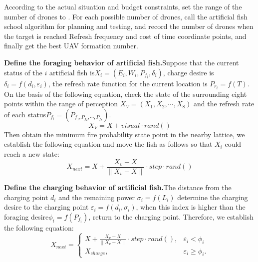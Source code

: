 \documentclass[13pt]{ctexart}
\begin{document}
According to the actual situation and budget constraints, set the range of the number of drones to . For each possible number of drones, call the artificial fish school algorithm for planning and testing, and record the number of drones when the target is reached Refresh frequency and cost of time coordinate points, and finally get the best UAV formation number.

\textbf{Define the foraging behavior of artificial fish.}\quad Suppose that the current status of the $i$ artificial fish is$X_{i}=(E_{i},W_{i},P_{f_{i}},\delta_{i})$, charge desire is $\delta_{i}=f(d_{i},\varepsilon_{i})$, the refresh rate function for the current location is $P_{r_{i}}=f(T)$. On the basis of the following equation, check the state of the surrounding eight points within the range of perception  $X_{V}=(X_{1},X_{2},\cdots,X_{8})$ and the refresh rate of each status$P_{f_{i}}=(P_{f_{1},P_{f_{2}},\cdots,P_{f_{8}}})$.
\begin{equation}
	{X_{V}=X+visual \cdot rand()}
	\tag{2.1}
\end{equation}
Then obtain the minimum fire probability state point in the nearby lattice, we establish the following equation and move the fish as follows so that $X_{i}$ could reach a new state:
\begin{equation}
	{X_{next}=X+\frac{X_{v}-X}{\left \|X_{v}-X \right \|} \cdot step \cdot rand()}
	\tag{2.2}
\end{equation}

\textbf{Define the charging behavior of artificial fish.}\quad The distance from the charging point $d_{i}$ and the remaining power $\sigma_{i}=f(L_{i})$ determine the charging desire to the charging point $\varepsilon_{i}=f(d_{i},\sigma_{i})$, when this index is higher than the foraging desire$\phi_{i}=f(P_{f_{i}})$, return to the charging point. Therefore, we establish the following equation:
\begin{equation}
	X_{next} =  \begin{cases}
		X+\frac{X_{v}-X}{\left \|X_{v}-X \right \|} \cdot step \cdot rand(),& \varepsilon_{i}<\phi_{i} \\
		X_{charge},& \varepsilon_{i}\geq\phi_{i}.
	\end{cases}
\end{equation}
\end{document}
